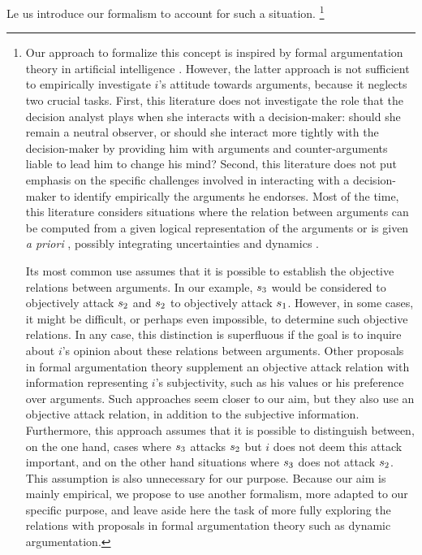 \documentclass[smallextended,nospthms, natbib]{svjour3}
\begin{document}
Le us introduce our formalism to account for such a situation.%
\footnote{Our approach to formalize this concept is inspired by formal argumentation theory in artificial intelligence \citep{dung_acceptability_1995, rahwan_argumentation_2009}. However, the latter approach is not sufficient to empirically investigate $i$'s attitude towards arguments, because it neglects two crucial tasks.
First, this literature does not investigate the role that the decision analyst plays when she interacts with a decision-maker: should she remain a neutral observer, or should she interact more tightly with the decision-maker by providing him with arguments and counter-arguments liable to lead him to change his mind? 
Second, this literature does not put emphasis on the specific challenges involved in interacting with a decision-maker to identify empirically the arguments he endorses. Most of the time, this literature considers situations where the relation between arguments can be computed from a given logical representation of the arguments \citep{besnard_elements_2008} or is given \emph{a priori} \citep{baroni_semantics_2009}, possibly integrating uncertainties \citep{hunter_probabilistic_2014} and dynamics \citep{rotstein_dynamic_2010, marcos_dynamic_2011, dimopoulos_control_2018}.

Its most common use assumes that it is possible to establish the objective relations between arguments. In our example, $s_3$ would be considered to objectively attack $s_2$ and $s_2$ to objectively attack $s_1$. However, in some cases, it might be difficult, or perhaps even impossible, to determine such objective relations. In any case, this distinction is superfluous if the goal is to inquire about $i$’s opinion about these relations between arguments.
Other proposals in formal argumentation theory \citep{amgoud_reasoning_2002, bench-capon_persuasion_2003, amgoud_making_2008, amgoud_using_2009, bench-capon_abstract_2009, ferretti_approach_2017} supplement an objective attack relation with information representing $i$’s subjectivity, such as his values or his preference over arguments. Such approaches seem closer to our aim, but they also use an objective attack relation, in addition to the subjective information. Furthermore, this approach assumes that it is possible to distinguish between, on the one hand, cases where $s_3$ attacks $s_2$ but $i$ does not deem this attack important, and on the other hand situations where $s_3$ does not attack $s_2$. This assumption is also unnecessary for our purpose. Because our aim is mainly empirical, we propose to use another formalism, more adapted to our specific purpose, and leave aside here the task of more fully exploring the relations with proposals in formal argumentation theory such as dynamic argumentation.}
%
\end{document}
